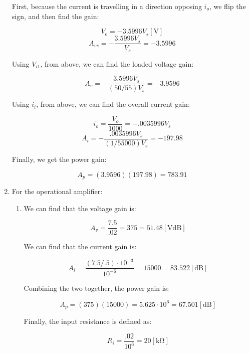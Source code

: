 \begin{enumerate}
    \begin{center}
      First, because the current is travelling in a direction opposing $i_o$, we flip the sign, and then find the gain:
    \end{center}
    $$V_o=-3.5996V_s[\si{\volt}]$$
    $$\boxed{A_{vs}=-\frac{3.5996V_s}{V_s}=-3.5996}$$

    \begin{center}
      Using $V_{i1}$, from above, we can find the loaded voltage gain:
    \end{center}
    $$\boxed{A_v=-\frac{3.5996V_s}{(50/55)V_s}=-3.9596}$$

    \begin{center}
      Using $i_{i}$, from above, we can find the overall current gain:
    \end{center}
    $$i_o=\frac{V_o}{1000}=-.0035996V_s$$
    $$\boxed{A_i=-\frac{.0035996V_s}{(1/55000)V_s}=-197.98}$$

    \begin{center}
      Finally, we get the power gain:
    \end{center}
    $$A_p=(3.9596)(197.98)=783.91$$

  \item For the operational amplifier:

    \begin{enumerate}

      \item

        \begin{center}
          We can find that the voltage gain is:
        \end{center}
        $$\boxed{A_{v}=\frac{7.5}{.02}=375=51.48[\si{\volt}\text{dB}]}$$

        \begin{center}
          We can find that the current gain is:
        \end{center}
        $$\boxed{A_{i}=\frac{(7.5/.5)\cdot10^{-3}}{10^{-6}}=15000=83.522[\text{dB}]}$$

        \begin{center}
          Combining the two together, the power gain is:
        \end{center}
        $$\boxed{A_{p}=(375)(15000)=5.625\cdot10^6=67.501[\text{dB}]}$$

        \begin{center}
          Finally, the input resistance is defined as:
        \end{center}
        $$\boxed{R_{i}=\frac{.02}{10^6}=20[\si{\kilo\ohm}]}$$


\end{enumerate}
\end{enumerate}
